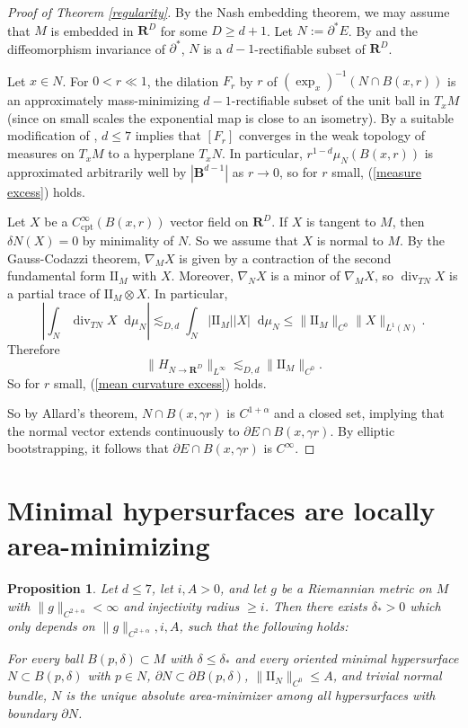 \documentclass[reqno,11pt]{amsart}
\newcommand{\RR}{\mathbf{R}}
\newcommand{\Ball}{\mathbf{B}}
\newcommand*\dif{\mathop{}\!\mathrm{d}}
\newcommand{\Two}{\mathrm{I\!I}}
\DeclareMathOperator{\Div}{div}
\newcommand{\cpt}{\mathrm{cpt}}
\newtheorem{proposition}[theorem]{Proposition}
\theoremstyle{definition}
\numberwithin{equation}{section}
\begin{document}
\begin{proof}[Proof of Theorem \ref{regularity}]
By the Nash embedding theorem, we may assume that $M$ is embedded in $\RR^D$ for some $D \geq d + 1$.
Let $N := \partial^* E$. 
By \cite[Theorem 4.11]{Giusti77} and the diffeomorphism invariance of $\partial^*$, $N$ is a $d - 1$-rectifiable subset of $\RR^D$.

Let $x \in N$.
For $0 < r \ll 1$, the dilation $F_r$ by $r$ of $(\exp_x)^{-1}(N \cap B(x, r))$ is an approximately mass-minimizing $d - 1$-rectifiable subset of the unit ball in $T_x M$ (since on small scales the exponential map is close to an isometry).
By a suitable modification of \cite[Chapters 9-10]{Giusti77}, $d \leq 7$ implies that $[F_r]$ converges in the weak topology of measures on $T_x M$ to a hyperplane $T_x N$.
In particular, $r^{1 - d} \mu_N(B(x, r))$ is approximated arbitrarily well by $|\Ball^{d - 1}|$ as $r \to 0$, so for $r$ small, (\ref{measure excess}) holds.

Let $X$ be a $C^\infty_\cpt(B(x, r))$ vector field on $\RR^D$.
If $X$ is tangent to $M$, then $\delta N(X) = 0$ by minimality of $N$.
So we assume that $X$ is normal to $M$.
By the Gauss-Codazzi theorem, $\nabla_M X$ is given by a contraction of the second fundamental form $\Two_M$ with $X$.
Moreover, $\nabla_N X$ is a minor of $\nabla_M X$, so $\Div_{TN} X$ is a partial trace of $\Two_M \otimes X$.
In particular,
$$\left|\int_N \Div_{TN} X \dif \mu_N\right| \lesssim_{D, d} \int_N |\Two_M| |X| \dif \mu_N \leq \|\Two_M\|_{C^0} \|X\|_{L^1(N)}.$$
Therefore 
$$\|H_{N \to \RR^D}\|_{L^\infty} \lesssim_{D, d} \|\Two_M\|_{C^0}.$$
So for $r$ small, (\ref{mean curvature excess}) holds.

So by Allard's theorem, $N \cap B(x, \gamma r)$ is $C^{1 + \alpha}$ and a closed set, implying that the normal vector extends continuously to $\partial E \cap B(x, \gamma r)$.
By elliptic bootstrapping, it follows that $\partial E \cap B(x, \gamma r)$ is $C^\infty$.
\end{proof}

\section{Minimal hypersurfaces are locally area-minimizing} \label{locally minimizing appendix}
\begin{proposition}\label{minimal implies locally minimizing}
Let $d \leq 7$, let $i, A > 0$, and let $g$ be a Riemannian metric on $M$ with $\|g\|_{C^{2 + \alpha}} < \infty$ and injectivity radius $\geq i$.
Then there exists $\delta_* > 0$ which only depends on $\|g\|_{C^{2 + \alpha}}, i, A$, such that the following holds:

For every ball $B(p, \delta) \subset M$ with $\delta \leq \delta_*$ and every oriented minimal hypersurface $N \subset B(p, \delta)$ with $p \in N$, $\partial N \subset \partial B(p, \delta)$, $\|\Two_N\|_{C^0} \leq A$, and trivial normal bundle, $N$ is the unique absolute area-minimizer among all hypersurfaces with boundary $\partial N$.
\end{proposition}
\end{document}
